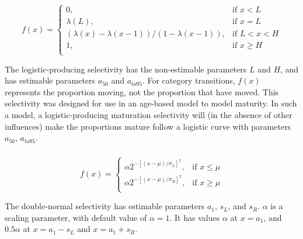 \subsubsection[Logistic producing]{}

\begin{equation} 
f(x)=\begin{cases}
	  0, & \text{if $x < L$} \\
	  \lambda(L), & \text{if $x=L$} \\
	  \left( \lambda(x)-\lambda(x-1) \right) / \left( 1-\lambda(x-1) \right), & \text{if $L < x < H$} \\
	  1, & \text{if $x \ge H$} \\  
  \end{cases}
\end{equation}

The logistic-producing selectivity has the non-estimable parameters $L$ and $H$, and has estimable parameters $a_{50}$ and $a_{to95}$. For category transitions, $f(x)$ represents the proportion moving, not the proportion that have moved. This selectivity was designed for use in an age-based model to model maturity. In such a model, a logistic-producing maturation selectivity will (in the absence of other influences) make the proportions mature follow a logistic curve with parameters $a_{50}$, $a_{to95}$.

\subsubsection[Double-normal]{}

\begin{equation}
  f(x) = \begin{cases}
    \alpha 2^{-[(x- \mu)/\sigma_L ]^2}, & \text{if $x \leq \mu$} \\
    \alpha 2^{-[(x- \mu)/\sigma_R ]^2}, & \text{if $x \ge \mu$}\\
  \end{cases}
\end{equation} 

The double-normal selectivity has estimable parameters $a_1$, $s_L$, and $s_R$. $\alpha$ is a scaling parameter, with default value of $\alpha = 1$. It has values $\alpha$ at $x=a_1$, and $0.5 \alpha$ at $x=a_1-s_L$ and $x=a_1+s_R$. 

\subsubsection[Double-exponential]{}

